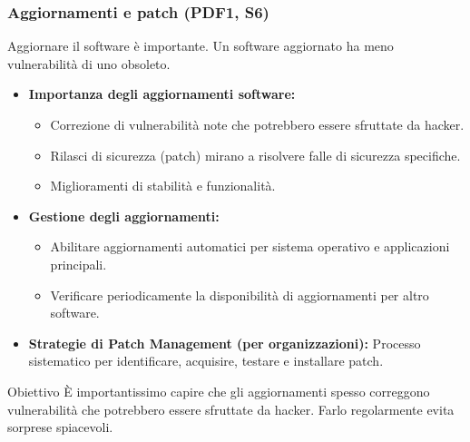 \documentclass{beamer}
\begin{document}
\begin{frame}
  \frametitle{Aggiornamenti e patch (PDF1, S6)}
  Aggiornare il software è importante. Un software aggiornato ha meno vulnerabilità di uno obsoleto.
  \begin{itemize}
    \item \textbf{Importanza degli aggiornamenti software:}
    \begin{itemize}
        \item Correzione di vulnerabilità note che potrebbero essere sfruttate da hacker.
        \item Rilasci di sicurezza (patch) mirano a risolvere falle di sicurezza specifiche.
        \item Miglioramenti di stabilità e funzionalità.
    \end{itemize}
    \item \textbf{Gestione degli aggiornamenti:}
    \begin{itemize}
        \item Abilitare aggiornamenti automatici per sistema operativo e applicazioni principali.
        \item Verificare periodicamente la disponibilità di aggiornamenti per altro software.
    \end{itemize}
    \item \textbf{Strategie di Patch Management (per organizzazioni):} Processo sistematico per identificare, acquisire, testare e installare patch.
  \end{itemize}
  \begin{block}{Obiettivo}
  È importantissimo capire che gli aggiornamenti spesso correggono vulnerabilità che potrebbero essere sfruttate da hacker. Farlo regolarmente evita sorprese spiacevoli.
  \end{block}
\end{frame}
\end{document}
